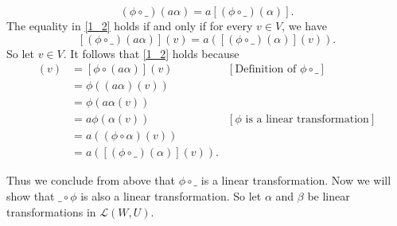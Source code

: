 \documentclass[9pt]{article}
\begin{document}
\begin{enumerate}
\begin{itemize}
               \begin{equation} \label{1_2}
                  (\phi\circ\_)(a\alpha) = a[(\phi\circ\_)(\alpha)].
               \end{equation}
               The equality in \eqref{1_2} holds if and only if for every
               $v \in V$, we have
               $$[(\phi\circ\_)(a\alpha)](v) = a([(\phi\circ\_)(\alpha)](v)).$$
               So let $v \in V$. It follows that \eqref{1_2} holds because
               \begin{align*}
                  [(\phi\circ\_)(a\alpha)](v) &= [\phi\circ(a\alpha)](v)
                     &[\text{Definition of }\phi\circ\_ ] \\
                     &= \phi((a\alpha)(v)) \\
                     &= \phi(a\alpha(v)) \\
                     &= a\phi(\alpha(v)) 
                        &[\phi\text{ is a linear transformation}] \\
                     &= a((\phi\circ\alpha)(v)) \\
                     &= a([(\phi\circ\_)(\alpha)](v)).
               \end{align*}
      \end{itemize}
      Thus we conclude from above that $\phi\circ\_$ is a linear transformation.
      Now we will show that $\_\circ\phi$ is also a linear transformation. So
      let $\alpha$ and $\beta$ be linear transformations in $\mathcal{L}(W, U)$.
      

\end{enumerate}
\end{document}
